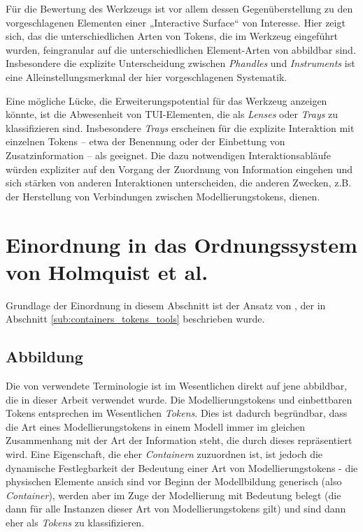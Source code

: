 Für die Bewertung des Werkzeugs ist vor allem dessen Gegenüberstellung zu den vorgeschlagenen Elementen einer „Interactive Surface“ von Interesse. Hier zeigt sich, das die unterschiedlichen Arten von Tokens, die im Werkzeug eingeführt wurden, feingranular auf die unterschiedlichen Element-Arten von \citep{Ishii97} abbildbar sind. Insbesondere die explizite Unterscheidung zwischen \emph{Phandles} und \emph{Instruments} ist eine Alleinstellungsmerkmal der hier vorgeschlagenen Systematik.

Eine mögliche Lücke, die Erweiterungspotential für das Werkzeug anzeigen könnte, ist die Abwesenheit von TUI-Elementen, die als \emph{Lenses} oder \emph{Trays} zu klassifizieren sind. Insbesondere \emph{Trays} erscheinen für die explizite Interaktion mit einzelnen Tokens -- etwa der Benennung oder der Einbettung von Zusatzinformation -- als geeignet. Die dazu notwendigen Interaktionsabläufe würden expliziter auf den Vorgang der Zuordnung von Information eingehen und sich stärken von anderen Interaktionen unterscheiden, die anderen Zwecken, z.B. der Herstellung von Verbindungen zwischen Modellierungstokens, dienen.

\section{Einordnung in das Ordnungssystem von Holmquist et al.}

Grundlage der Einordnung in diesem Abschnitt ist der Ansatz von \citep{Holmquist99}, der in Abschnitt \ref{sub:containers_tokens_tools} beschrieben wurde.

\subsection{Abbildung}

Die von \citeauthor{Holmquist99} verwendete Terminologie ist im Wesentlichen direkt auf jene abbildbar, die in dieser Arbeit verwendet wurde. Die Modellierungstokens und einbettbaren Tokens entsprechen im Wesentlichen \emph{Tokens}. Dies ist dadurch begründbar, dass die Art eines Modellierungstokens in einem Modell immer im gleichen Zusammenhang mit der Art der Information steht, die durch dieses repräsentiert wird. Eine Eigenschaft, die eher \emph{Containern} zuzuordnen ist, ist jedoch die dynamische Festlegbarkeit der Bedeutung einer Art von Modellierungstokens - die physischen Elemente ansich sind vor Beginn der Modellbildung generisch (also \emph{Container}), werden aber im Zuge der Modellierung mit Bedeutung belegt (die dann für alle Instanzen dieser Art von Modellierungstokens gilt) und sind dann eher als \emph{Tokens} zu klassifizieren. 

